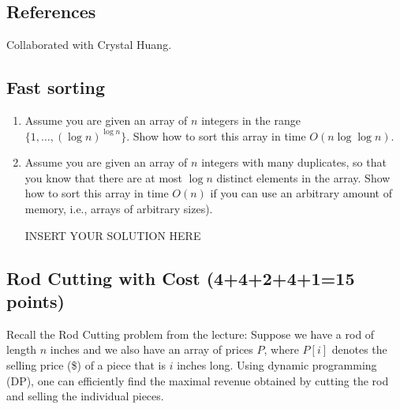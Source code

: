 \def\lc{\left\lceil}   
\def\rc{\right\rceil}
\runningheadrule
\firstpageheadrule
\cfoot{}
\subsection*{References}
Collaborated with Crystal Huang.

\subsection{Fast sorting}

\begin{enumerate}
    \item Assume you are given an array of $n$ integers in the range
    $\{1,\ldots, (\log n)^{\log n}\}$. Show how to sort this array in time
    $O(n \log\!\log n)$.

\begin{solution}

\end{solution}


    \item Assume you are given an array of $n$ integers with many
    duplicates, so that you know that there are at most $\log n$
    distinct elements in the array. Show how to sort this array in time
    $O(n)$ if you can use an arbitrary amount of memory, i.e., arrays of arbitrary sizes).

\begin{solution}   INSERT YOUR SOLUTION HERE   \end{solution}
\end{enumerate}





\subsection{Rod Cutting with Cost (4+4+2+4+1=15 points)}
Recall the Rod Cutting problem from the lecture: Suppose we have a rod of length $n$ inches and we also have an array of prices $P$, where $P[i]$ denotes the selling price (\$) of a piece that is $i$ inches long. Using dynamic programming (DP), one can efficiently find the maximal revenue obtained by cutting the rod and selling the individual pieces. 

